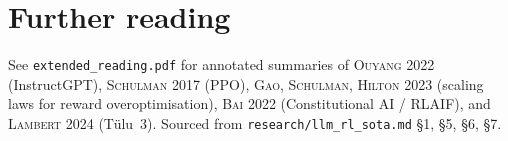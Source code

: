 \documentclass[11pt,oneside]{scrbook}
\begin{document}
\chapter{Further reading}

See \texttt{extended\_reading.pdf} for annotated summaries of
\textsc{Ouyang 2022} (InstructGPT), \textsc{Schulman 2017} (PPO),
\textsc{Gao, Schulman, Hilton 2023} (scaling laws for reward
overoptimisation), \textsc{Bai 2022} (Constitutional AI / RLAIF), and
\textsc{Lambert 2024} (T\"ulu~3). Sourced from
\texttt{research/llm\_rl\_sota.md} §1, §5, §6, §7.
\end{document}
